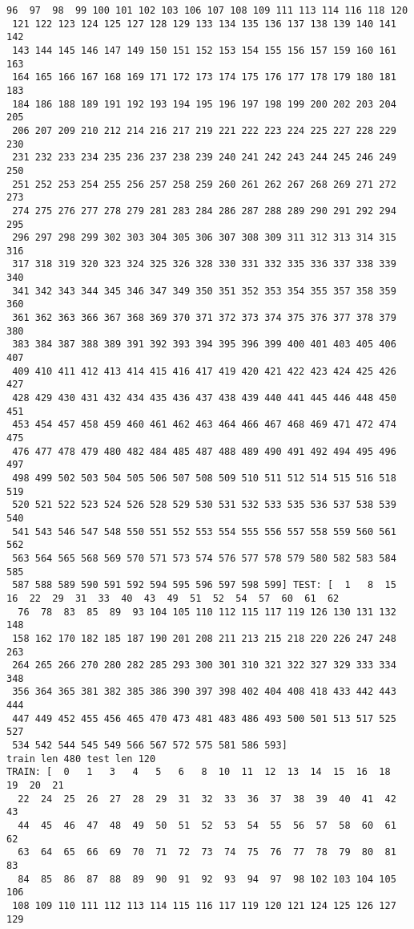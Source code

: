 \documentclass[11pt]{article}
\begin{document}
\begin{Verbatim}[commandchars=\\\{\}]
  96  97  98  99 100 101 102 103 106 107 108 109 111 113 114 116 118 120
 121 122 123 124 125 127 128 129 133 134 135 136 137 138 139 140 141 142
 143 144 145 146 147 149 150 151 152 153 154 155 156 157 159 160 161 163
 164 165 166 167 168 169 171 172 173 174 175 176 177 178 179 180 181 183
 184 186 188 189 191 192 193 194 195 196 197 198 199 200 202 203 204 205
 206 207 209 210 212 214 216 217 219 221 222 223 224 225 227 228 229 230
 231 232 233 234 235 236 237 238 239 240 241 242 243 244 245 246 249 250
 251 252 253 254 255 256 257 258 259 260 261 262 267 268 269 271 272 273
 274 275 276 277 278 279 281 283 284 286 287 288 289 290 291 292 294 295
 296 297 298 299 302 303 304 305 306 307 308 309 311 312 313 314 315 316
 317 318 319 320 323 324 325 326 328 330 331 332 335 336 337 338 339 340
 341 342 343 344 345 346 347 349 350 351 352 353 354 355 357 358 359 360
 361 362 363 366 367 368 369 370 371 372 373 374 375 376 377 378 379 380
 383 384 387 388 389 391 392 393 394 395 396 399 400 401 403 405 406 407
 409 410 411 412 413 414 415 416 417 419 420 421 422 423 424 425 426 427
 428 429 430 431 432 434 435 436 437 438 439 440 441 445 446 448 450 451
 453 454 457 458 459 460 461 462 463 464 466 467 468 469 471 472 474 475
 476 477 478 479 480 482 484 485 487 488 489 490 491 492 494 495 496 497
 498 499 502 503 504 505 506 507 508 509 510 511 512 514 515 516 518 519
 520 521 522 523 524 526 528 529 530 531 532 533 535 536 537 538 539 540
 541 543 546 547 548 550 551 552 553 554 555 556 557 558 559 560 561 562
 563 564 565 568 569 570 571 573 574 576 577 578 579 580 582 583 584 585
 587 588 589 590 591 592 594 595 596 597 598 599] TEST: [  1   8  15  16  22  29  31  33  40  43  49  51  52  54  57  60  61  62
  76  78  83  85  89  93 104 105 110 112 115 117 119 126 130 131 132 148
 158 162 170 182 185 187 190 201 208 211 213 215 218 220 226 247 248 263
 264 265 266 270 280 282 285 293 300 301 310 321 322 327 329 333 334 348
 356 364 365 381 382 385 386 390 397 398 402 404 408 418 433 442 443 444
 447 449 452 455 456 465 470 473 481 483 486 493 500 501 513 517 525 527
 534 542 544 545 549 566 567 572 575 581 586 593]
train len 480 test len 120
TRAIN: [  0   1   3   4   5   6   8  10  11  12  13  14  15  16  18  19  20  21
  22  24  25  26  27  28  29  31  32  33  36  37  38  39  40  41  42  43
  44  45  46  47  48  49  50  51  52  53  54  55  56  57  58  60  61  62
  63  64  65  66  69  70  71  72  73  74  75  76  77  78  79  80  81  83
  84  85  86  87  88  89  90  91  92  93  94  97  98 102 103 104 105 106
 108 109 110 111 112 113 114 115 116 117 119 120 121 124 125 126 127 129

\end{Verbatim}
\end{document}

